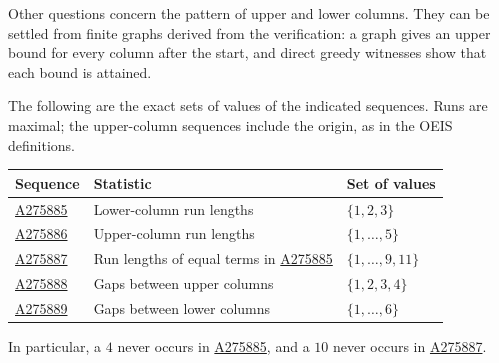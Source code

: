Other questions concern the pattern of upper and lower columns. They
can be settled from finite graphs derived from the verification: a
graph gives an upper bound for every column after the start, and
direct greedy witnesses show that each bound is attained.

\begin{corollary}\label{cor:oeis-runs}
The following are the exact sets of values of the indicated sequences.
Runs are maximal; the upper-column sequences include the origin, as in
the OEIS definitions.
\begin{center}
\begin{tabular}{lll}
\toprule
Sequence&Statistic&Set of values\\
\midrule
\href{https://oeis.org/A275885}{A275885}&Lower-column run lengths&$\{1,2,3\}$\\
\href{https://oeis.org/A275886}{A275886}&Upper-column run lengths&$\{1,\ldots,5\}$\\
\href{https://oeis.org/A275887}{A275887}&Run lengths of equal terms in \href{https://oeis.org/A275885}{A275885}&$\{1,\ldots,9,11\}$\\
\href{https://oeis.org/A275888}{A275888}&Gaps between upper columns&$\{1,2,3,4\}$\\
\href{https://oeis.org/A275889}{A275889}&Gaps between lower columns&$\{1,\ldots,6\}$\\
\bottomrule
\end{tabular}
\end{center}
In particular, a $4$ never occurs in \href{https://oeis.org/A275885}{A275885}, and a $10$ never occurs
in \href{https://oeis.org/A275887}{A275887}.
\end{corollary}
